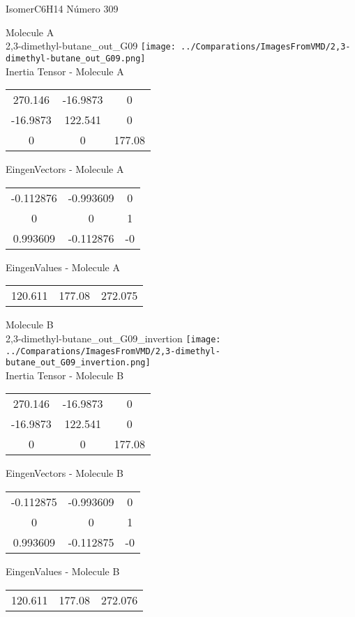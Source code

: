 \vtab[-2cm]
\begin{center}
{\large IsomerC6H14 \tab Número 309}
\end{center}
\begin{multicols}{2}
\begin{center}

Molecule A \\ 
2,3-dimethyl-butane\_out\_G09
\texttt{[image: ../Comparations/ImagesFromVMD/2,3-dimethyl-butane\_out\_G09.png]}
\\
Inertia Tensor - Molecule A \\
\vtab

\begin{tabular}{|c c c|}
270.146	 & 	-16.9873	 & 	0	 \\
-16.9873	 & 	122.541	 & 	0	 \\
0	 & 	0	 & 	177.08
\end{tabular}

\vtab
 EingenVectors - Molecule A     \\
\vtab
\begin{tabular}{|c c c|}
-0.112876	 & 	-0.993609	 & 	0	 \\
0	 & 	0	 & 	1	 \\
0.993609	 & 	-0.112876	 & 	-0
\end{tabular}

\vtab
 EingenValues - Molecule A     \\
\vtab
\begin{tabular}{|c c c|}
120.611	 & 	177.08	 & 	272.075	 \\
\end{tabular}
\columnbreak

Molecule B \\ 
2,3-dimethyl-butane\_out\_G09\_invertion
\texttt{[image: ../Comparations/ImagesFromVMD/2,3-dimethyl-butane\_out\_G09\_invertion.png]}
\\
Inertia Tensor - Molecule B \\
\vtab

\begin{tabular}{|c c c|}
270.146	 & 	-16.9873	 & 	0	 \\
-16.9873	 & 	122.541	 & 	0	 \\
0	 & 	0	 & 	177.08
\end{tabular}

\vtab
 EingenVectors - Molecule B     \\
\vtab
\begin{tabular}{|c c c|}
-0.112875	 & 	-0.993609	 & 	0	 \\
0	 & 	0	 & 	1	 \\
0.993609	 & 	-0.112875	 & 	-0
\end{tabular}

\vtab
 EingenValues - Molecule B     \\
\vtab
\begin{tabular}{|c c c|}
120.611	 & 	177.08	 & 	272.076	 \\
\end{tabular}

\end{center}
\end{multicols}

